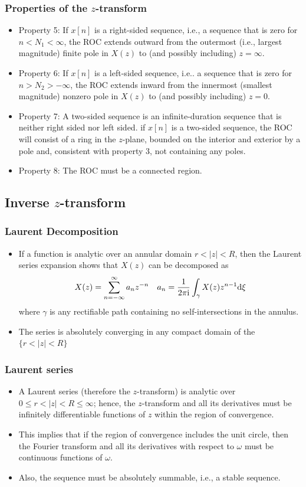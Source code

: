 \begin{frame}
\frametitle{Properties of the $z$-transform}
\begin{itemize}
\item \alert{Property 5}: If $x[n]$ is a \alert{right-sided sequence}, i.e., a sequence that is zero for $ n<N_{1}<\infty$, the ROC extends outward from the \alert{outermost} (i.e., largest magnitude) finite pole in $X(z)$ to (and possibly including) $ z=\infty$.
\item \alert{Property 6}: If $x[n]$ is a \alert{left-sided sequence}, i.e.. a sequence that is zero for $n>  N_{2}>-\infty$, the ROC extends inward from the \alert{innermost} (smallest magnitude) nonzero pole in $X(z)$ to (and possibly including) $z=0$.
\item \alert{Property 7}: A \alert{two-sided sequence} is an infinite-duration sequence that is neither right sided nor left sided. if $x[n]$ is a two-sided sequence, the ROC will consist of a ring in the $z$-plane, bounded on the interior and exterior by a pole and, consistent with property 3, not containing any poles.
\item \alert{Property 8}: The ROC must be a connected region.
\end{itemize}
\end{frame}
\subsection{Inverse $z$-transform}
\begin{frame}
\frametitle{Laurent Decomposition}
\begin{itemize}
\item If a function is analytic over an annular domain $r < |z| < R$, then the Laurent series expansion
shows that $X(z)$ can be decomposed as
\[
X(z)= \sum_{n=-\infty}^\infty a_n z^{-n} \quad a_n= \frac{1}{2 \pi \mathrm{i}} \int_{\gamma} X(z) z^{n-1} \mathrm{d} \xi
\]
where $\gamma$ is any rectifiable path containing no self-intersections in the annulus.
\item The series is absolutely converging in any compact domain of the $\{r < |z| < R\}$
\end{itemize}
\end{frame}



\begin{frame}
\frametitle{Laurent series}
\begin{itemize}
\item A Laurent series (therefore the $z$-transform) is analytic over $0 \leq r < |z| < R \leq \infty$; hence, the $z$-transform and all its derivatives must be infinitely differentiable functions of $z$ within the region of convergence.
\item This implies that if the region of convergence includes the unit circle, then the Fourier transform and all its derivatives with respect to $\omega$ must be continuous functions of $\omega$.
\item Also,  the sequence must be absolutely summable, i.e., a stable sequence.
\end{itemize}
\end{frame}

